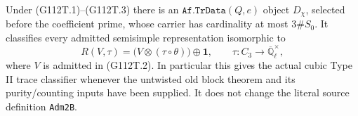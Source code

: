 \begin{proposition}
\label{prop:G112-twist}
Under (G112T.1)--(G112T.3) there is an
\(\texttt{Af.TrData}(Q,e)\) object \(D_\chi\), selected before the
coefficient prime, whose carrier has cardinality at most \(3\#S_0\).
It classifies every admitted semisimple representation isomorphic to
\[
 R(V,\tau)=\bigl(V\otimes(\tau\circ\theta)\bigr)\oplus\mathbf1,
       \qquad \tau:C_3\to\overline{\mathbb Q}_\ell^\times,
                                                        \tag{G112T.4}
\]
where \(V\) is admitted in (G112T.2).  In particular this gives the
actual cubic Type II trace classifier whenever the untwisted old
block theorem and its purity/counting inputs have been supplied.
It does not change the literal source definition \texttt{Adm2B}.
\end{proposition}

